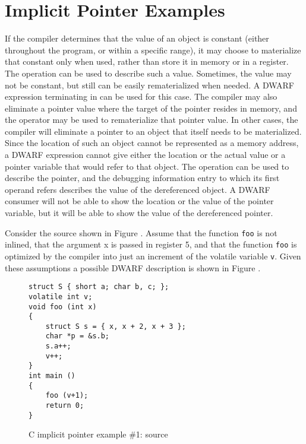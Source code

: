 \section{Implicit Pointer Examples}
\label{app:implicitpointerexamples}
If the compiler determines that the value of an object is
constant (either throughout the program, or within a specific
range), it may choose to materialize that constant only when
used, rather than store it in memory or in a register. The
\DWOPimplicitvalue{} operation can be used to describe such a
value. Sometimes, the value may not be constant, but still can be
easily rematerialized when needed. A DWARF expression terminating
in \DWOPstackvalue{} can be used for this case. The compiler may
also eliminate a pointer value where the target of the pointer
resides in memory, and the \DWOPstackvalue{} operator may be used
to rematerialize that pointer value. In other cases, the compiler
will eliminate a pointer to an object that itself needs to be
materialized. Since the location of such an object cannot be
represented as a memory address, a DWARF expression cannot give
either the location or the actual value or a pointer variable
that would refer to that object. The \DWOPimplicitpointer{}
operation can be used to describe the pointer, and the debugging
information entry to which its first operand refers describes the
value of the dereferenced object. A DWARF consumer will not be
able to show the location or the value of the pointer variable,
but it will be able to show the value of the dereferenced
pointer.

Consider the  source shown in 
Figure .
Assume that the function \texttt{foo} is not inlined,
that the argument x is passed in register 5, and that the
function \texttt{foo} is optimized by the compiler into just 
an increment of the volatile variable \texttt{v}. Given these
assumptions a possible DWARF description is shown in
Figure .

\begin{figure}[h]
\begin{lstlisting}
struct S { short a; char b, c; };
volatile int v;
void foo (int x)
{
    struct S s = { x, x + 2, x + 3 };
    char *p = &s.b;
    s.a++;
    v++;
}
int main ()
{
    foo (v+1);
    return 0;
}
\end{lstlisting}
\caption{C implicit pointer example \#1: source}
\label{fig:cimplicitpointerexample1source}
\end{figure}

